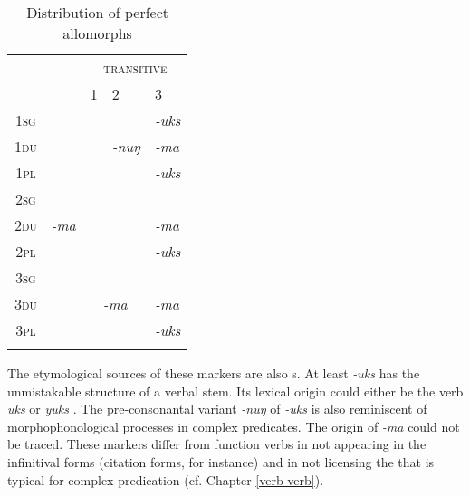 \begin{table}
\begin{centering} 
\begin{tabular}{c|c|p{1.5cm}|p{1.5cm}|p{1.5cm}}
\lsptoprule
		& {\multirow{2}{*}{\scshape intransitive}}&	\multicolumn{3}{c}{ {\scshape transitive}}  \\
		&&	 {\scshape 1}&  {\scshape 2} & {\scshape  3} \\
\hline
 {\scshape 1sg} 		&& \cellcolor[gray]{.8}&&\it -uks \\
 \cline{1-1} \cline{5-5} 		
 {\scshape 1du}		& & \cellcolor[gray]{.8}&\it -nuŋ&\it -ma\\
 \cline{1-1} \cline{5-5} 			
 {\scshape 1pl}	&& \cellcolor[gray]{.8}&&\it -uks\\
 \cline{1-1}  \cline{3-4} 		
 {\scshape 2sg	}	& && \cellcolor[gray]{.8} &   \\
 \cline{1-1} \cline{5-5}			
 {\scshape 2du}	&\it -ma && \cellcolor[gray]{.8}  &\it -ma\\
 \cline{1-1} \cline{5-5}			
 {\scshape 2pl}	& && \cellcolor[gray]{.8}   &\it -uks\\
\cline{1-1}  \cline{4-4} 
 {\scshape 3sg}		&&\multicolumn{2}{c|}{}  & \\
  \cline{1-1}  \cline{5-5}					
 {\scshape 3du}&&\multicolumn{2}{c|}{\it -ma}  &\it -ma\\
 \cline{1-1} \cline{5-5}
 {\scshape 3pl}& &\multicolumn{2}{l|}{}  &\it -uks \\
\lspbottomrule
\end{tabular}
\caption{Distribution of perfect allomorphs}\label{par-prf-allo}
\end{centering}
\end{table}

The etymological sources of these markers are also s. At least \emph{-uks} has the unmistakable structure of a verbal stem. Its lexical origin could either be the verb \emph{uks}  or \emph{yuks} . The pre-consonantal variant \emph{-nuŋ} of \emph{-uks} is also reminiscent of morphophonological processes in complex predicates. The origin of \emph{-ma} could not be traced. These markers differ from function verbs in not appearing in the infinitival forms (citation forms, for instance) and in not licensing the  that is typical for complex predication (cf. Chapter \ref{verb-verb}). 

